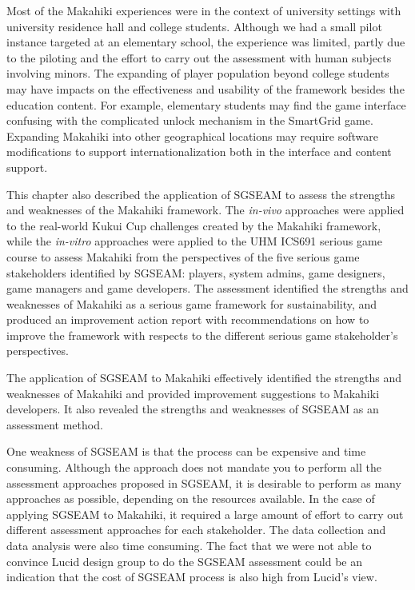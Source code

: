 Most of the Makahiki experiences were in the context of university settings with university residence hall and college students. Although we had a small pilot instance targeted at an elementary school, the experience was limited, partly due to the piloting and the effort to carry out the assessment with human subjects involving minors. The expanding of player population beyond college students may have impacts on the effectiveness and usability of the framework besides the education content. For example, elementary students may find the game interface confusing with the complicated unlock mechanism in the SmartGrid game. Expanding Makahiki into other geographical locations may require software modifications to support internationalization both in the interface and content support. 

This chapter also described the application of SGSEAM to assess the strengths and weaknesses of the Makahiki framework. The {\em in-vivo} approaches were applied to the real-world Kukui Cup challenges created by the Makahiki framework, while the {\em in-vitro} approaches were applied to the UHM ICS691 serious game course to assess Makahiki from the perspectives of the five serious game stakeholders identified by SGSEAM: players, system admins, game designers, game managers and game developers. The assessment identified the strengths and weaknesses of Makahiki as a serious game framework for sustainability, and produced an improvement action report with recommendations on how to improve the framework with respects to the different serious game stakeholder's perspectives. 

The application of SGSEAM to Makahiki effectively identified the strengths and weaknesses of Makahiki and provided improvement suggestions to Makahiki developers. It also revealed the strengths and weaknesses of SGSEAM as an assessment method. 

One weakness of SGSEAM is that the process can be expensive and time consuming. Although the approach does not mandate you to perform all the assessment approaches proposed in SGSEAM, it is desirable to perform as many approaches as possible, depending on the resources available. In the case of applying SGSEAM to Makahiki, it required a large amount of effort to carry out different assessment approaches for each stakeholder. The data collection and data analysis were also time consuming. The fact that we were not able to convince Lucid design group to do the SGSEAM assessment could be an indication that the cost of SGSEAM process is also high from Lucid's view.

